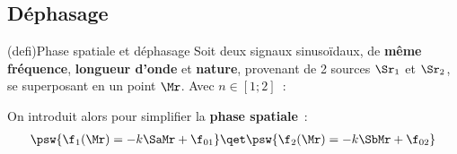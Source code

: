 \documentclass[../../main/main.tex]{subfiles}
\begin{document}
\subsection{Déphasage}
\begin{tcb*}[breakable](defi){Phase spatiale et déphasage}
	Soit deux signaux sinusoïdaux, de \textbf{même fréquence}, \textbf{longueur
		d'onde} et \textbf{nature}, provenant de 2 sources $\Sr_1$ et $\Sr_2$, se
	superposant en un point $\Mr$. Avec $n \in [1;2]$~:
	\smallbreak
	\begin{isd}[righthand ratio=.25]
		\vspace{-20pt}
		On introduit alors pour simplifier la \textbf{phase spatiale}~:
		\begin{gather*}
			\psw{%
				\f_1(\Mr) = -k\SaMr + \f_{01}
			}%
			\qet
			\psw{%
				\f_2(\Mr) = -k\SbMr + \f_{02}
			}%
		\end{gather*}
		\vspace{-15pt}
		\tcblower
		\begin{center}
\end{center}
\end{isd}
\end{tcb*}
\end{document}
